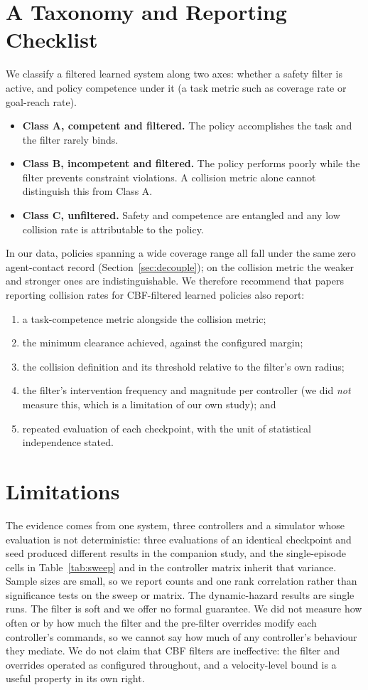 \documentclass[12pt]{article}
\begin{document}
\section{A Taxonomy and Reporting Checklist}
We classify a filtered learned system along two axes: whether a safety
filter is active, and policy competence under it (a task metric such as
coverage rate or goal-reach rate).
\begin{itemize}
  \item \textbf{Class A, competent and filtered.} The policy accomplishes the
        task and the filter rarely binds.
  \item \textbf{Class B, incompetent and filtered.} The policy performs
        poorly while the filter prevents constraint violations. A collision
        metric alone cannot distinguish this from Class A.
  \item \textbf{Class C, unfiltered.} Safety and competence are entangled and
        any low collision rate is attributable to the policy.
\end{itemize}
In our data, policies spanning a wide coverage range all fall under the same
zero agent-contact record (Section~\ref{sec:decouple}); on the collision
metric the weaker and stronger ones are indistinguishable. We therefore
recommend that papers reporting collision rates for CBF-filtered learned
policies also report:
\begin{enumerate}
  \item a task-competence metric alongside the collision metric;
  \item the minimum clearance achieved, against the configured margin;
  \item the collision definition and its threshold relative to the filter's
        own radius;
  \item the filter's intervention frequency and magnitude per controller
        (we did \emph{not} measure this, which is a limitation of our own
        study); and
  \item repeated evaluation of each checkpoint, with the unit of
        statistical independence stated.
\end{enumerate}

\section{Limitations}
The evidence comes from one system, three controllers and a simulator whose
evaluation is not deterministic: three evaluations of an identical
checkpoint and seed produced different results in the companion study, and
the single-episode cells in Table~\ref{tab:sweep} and in the controller
matrix inherit that variance. Sample sizes are small, so we report counts
and one rank correlation rather than significance tests on the sweep or
matrix. The dynamic-hazard results are single runs. The filter is soft and
we offer no formal guarantee. We did not measure how often or by how much
the filter and the pre-filter overrides modify each controller's commands,
so we cannot say how much of any controller's behaviour they mediate. We do
not claim that CBF filters are ineffective: the filter and overrides
operated as configured throughout, and a velocity-level bound is a useful
property in its own right.
\end{document}
